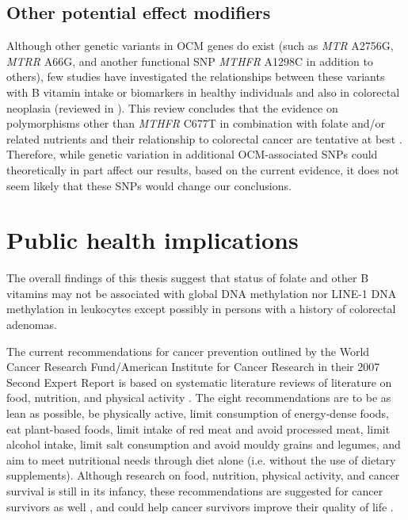 \subsection{Other potential effect modifiers} %
\noindent Although other genetic variants in OCM genes do exist (such as \emph{MTR} A2756G, \emph{MTRR} A66G, and another functional SNP \emph{MTHFR} A1298C in addition to others), few studies have investigated the relationships between these variants with B vitamin intake or biomarkers in healthy individuals and also in colorectal neoplasia (reviewed in \cite{c785}). This review concludes that the evidence on polymorphisms other than \emph{MTHFR} C677T in combination with folate and/or related nutrients and their relationship to colorectal cancer are tentative at best \cite{c785}. Therefore, while genetic variation in additional OCM-associated SNPs could theoretically in part affect our results, based on the current evidence, it does not seem likely that these SNPs would change our conclusions. 
 
\section[]{Public health implications} %
\noindent The overall findings of this thesis suggest that status of folate and other B vitamins may not be associated with global  DNA methylation nor LINE-1 DNA methylation in leukocytes except possibly in persons with a history of colorectal adenomas. 
 
\noindent The current recommendations for cancer prevention outlined by the World Cancer Research Fund/American Institute for Cancer Research in their 2007 Second Expert Report is based on systematic literature reviews of literature on food, nutrition, and physical activity \cite{c786}. The eight recommendations are to be as lean as possible, be physically active, limit consumption of energy-dense foods, eat plant-based foods, limit intake of red meat and avoid processed meat, limit alcohol intake, limit salt consumption and avoid mouldy grains and legumes, and aim to meet nutritional needs through diet alone (i.e. without the use of dietary supplements). Although research on food, nutrition, physical activity, and cancer survival is still in its infancy, these recommendations are suggested for cancer survivors as well \cite{c786}, and could help cancer survivors improve their quality of life \cite{c787}. 
 
